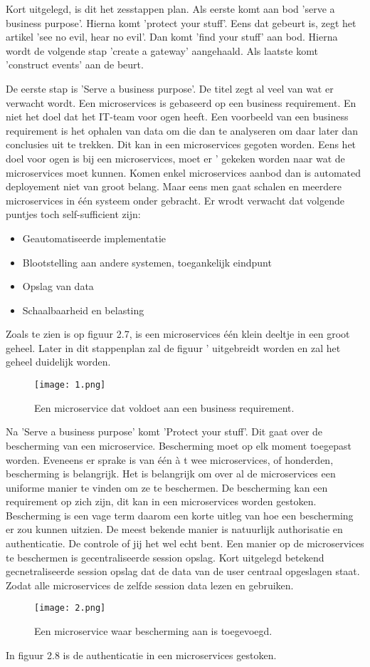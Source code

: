 Kort uitgelegd, is dit het zesstappen plan. Als eerste komt aan bod 'serve a business purpose'. Hierna komt 'protect your stuff'. Eens dat gebeurt is, zegt het artikel 'see no evil, hear no evil'. Dan komt 'find your stuff' aan bod. Hierna wordt de volgende stap 'create a gateway' aangehaald. Als laatste komt 'construct events' aan de beurt.

De eerste stap is 'Serve a business purpose'. De titel zegt al veel van wat er verwacht wordt. Een microservices is gebaseerd op een business requirement. En niet het doel dat het IT-team voor ogen heeft. Een voorbeeld van een business requirement is het ophalen van data om die dan te analyseren om daar later dan conclusies uit te trekken. Dit kan in een microservices gegoten worden. Eens het doel voor ogen is bij een microservices, moet er ' gekeken worden naar wat de microservices moet kunnen. Komen enkel microservices aanbod dan is automated deployement niet van groot belang. Maar eens men gaat schalen en meerdere microservices in één systeem onder gebracht. Er wrodt verwacht dat volgende puntjes toch self-sufficient zijn:
\begin{itemize}
	\item Geautomatiseerde implementatie
	\item Blootstelling aan andere systemen, toegankelijk eindpunt
	\item Opslag van data
	\item Schaalbaarheid en belasting
\end{itemize}
Zoals te zien is op figuur 2.7, is een microservices één klein deeltje in een groot geheel. Later in dit stappenplan zal de figuur ' uitgebreidt worden en zal het geheel duidelijk worden. 
\begin{figure}[h]
	\texttt{[image: 1.png]}
	\caption{Een microservice dat voldoet aan een business requirement. \textcite{Benetis2016}}
	\centering
\end{figure}

Na 'Serve a business purpose' komt 'Protect your stuff'. Dit gaat over de bescherming van een microservice. Bescherming moet op elk moment toegepast worden. Eveneens er sprake is van één à t wee microservices, of honderden, bescherming is belangrijk. Het is belangrijk om over al de microservices een uniforme manier te vinden om ze te beschermen. De bescherming kan een requirement op zich zijn, dit kan in een microservices worden gestoken. Bescherming is een vage term daarom een korte uitleg van hoe een bescherming er zou kunnen uitzien. De meest bekende manier is natuurlijk authorisatie en authenticatie.  De controle of jij het  wel echt bent. Een manier op de microservices te beschermen is gecentraliseerde session opslag. Kort uitgelegd betekend gecnetraliseerde session opslag dat de data van de user centraal opgeslagen staat. Zodat alle microservices de zelfde session data lezen en gebruiken. 
\begin{figure}[h]
	\texttt{[image: 2.png]}
	\caption{Een microservice waar bescherming aan is toegevoegd. \textcite{Benetis2016}}
	\centering
\end{figure}
In figuur 2.8 is de authenticatie in een microservices gestoken. 

